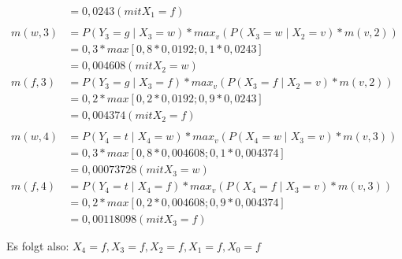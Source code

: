 \documentclass[a4paper,10pt]{article}
\begin{document}
\begin{enumerate}[~~(a)]
\begin{align*}
		&= 0,0243  (mit X_1 = f)\\ \\
		m(w,3) &= P(Y_3 = g \mid X_3 = w) * max_v (P(X_3 = w \mid X_2 = v) * m(v,2)) \\
		&= 0,3 * max[0,8*0,0192;0,1*0,0243]\\
		&= 0,004608  (mit X_2 = w)\\
		m(f,3) &= P(Y_3 = g \mid X_3 = f) * max_v (P(X_3 = f \mid X_2 = v) * m(v,2)) \\
		&= 0,2 * max[0,2*0,0192;0,9*0,0243]\\
		&= 0,004374  (mit X_2 = f)\\ \\
		m(w,4) &= P(Y_4 = t \mid X_4 = w) * max_v (P(X_4 = w \mid X_3 = v) * m(v,3)) \\
		&= 0,3 * max[0,8*0,004608;0,1*0,004374]\\
		&= 0,00073728  (mit X_3 = w)\\
		m(f,4) &= P(Y_4 = t \mid X_4 = f) * max_v (P(X_4 = f \mid X_3 = v) * m(v,3)) \\
		&= 0,2 * max[0,2*0,004608;0,9*0,004374]\\
		&= 0,00118098  (mit X_3 = f)\\ \\
	\end{align*}
Es folgt also:
$X_4 = f, X_3 = f, X_2 = f, X_1 = f, X_0 = f$
\end{enumerate}
\end{document}
